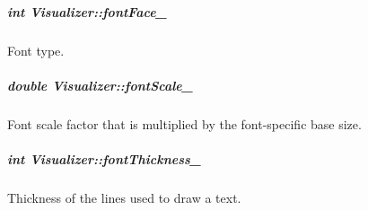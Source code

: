 \hypertarget{group___core_a0aa6d2b6b8db04a4242fbfec555c88d1}{
\subparagraph[{font\-Face\-\_\-}]{\setlength{\rightskip}{0pt plus 5cm}int Visualizer\-::font\-Face\-\_\-\hspace{0.3cm}{\ttfamily [private]}}}\label{group___core_a0aa6d2b6b8db04a4242fbfec555c88d1}


Font type. 

\hypertarget{group___core_a9b91ed2be01274b57be07c01545ff802}{
\subparagraph[{font\-Scale\-\_\-}]{\setlength{\rightskip}{0pt plus 5cm}double Visualizer\-::font\-Scale\-\_\-\hspace{0.3cm}{\ttfamily [private]}}}\label{group___core_a9b91ed2be01274b57be07c01545ff802}


Font scale factor that is multiplied by the font-\/specific base size. 

\hypertarget{group___core_a5438944d7404d76256e5d0fb4ddecdaf}{
\subparagraph[{font\-Thickness\-\_\-}]{\setlength{\rightskip}{0pt plus 5cm}int Visualizer\-::font\-Thickness\-\_\-\hspace{0.3cm}{\ttfamily [private]}}}\label{group___core_a5438944d7404d76256e5d0fb4ddecdaf}


Thickness of the lines used to draw a text. 

